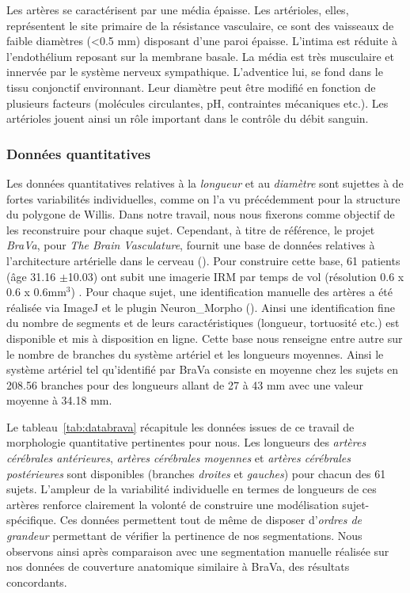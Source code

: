 Les artères se caractérisent par une média épaisse. Les artérioles, elles, représentent le site primaire de la résistance vasculaire, ce sont des vaisseaux de faible diamètres (<0.5 mm) disposant d’une paroi épaisse. L’intima est réduite à l’endothélium reposant sur la membrane basale. La média est très musculaire et innervée par le système nerveux sympathique. L’adventice lui, se fond dans le tissu conjonctif environnant. Leur diamètre peut être modifié en fonction de plusieurs facteurs (molécules circulantes, pH, contraintes mécaniques etc.). Les artérioles jouent ainsi un rôle important dans le contrôle du débit sanguin.

\subsubsection{Données quantitatives}
Les données quantitatives relatives à la {\em longueur} et au {\em diamètre} sont sujettes à de fortes variabilités individuelles, comme on l'a vu précédemment pour la structure du polygone de Willis. Dans notre travail, nous nous fixerons comme objectif de les reconstruire pour chaque sujet. Cependant, à titre de référence, le projet {\em BraVa}, pour {\em The Brain Vasculature}, fournit une base de données relatives à l'architecture artérielle dans le cerveau (\cite{Wright2013}). Pour construire cette base, 61 patients (âge 31.16 $\pm$10.03) ont subit une imagerie IRM par temps de vol (résolution 0.6 x 0.6 x 0.6mm$^3$) . Pour chaque sujet, une identification manuelle des artères a été réalisée via ImageJ et le plugin Neuron\_Morpho (\cite{neuronmorpho}). Ainsi une identification fine du nombre de segments et de leurs caractéristiques (longueur, tortuosité etc.) est disponible et mis à disposition en ligne. Cette base nous renseigne entre autre sur le nombre de branches du système artériel et les longueurs moyennes. Ainsi le système artériel tel qu'identifié par BraVa consiste en moyenne chez les sujets en 208.56 branches pour des longueurs allant de 27 à 43 mm avec une valeur moyenne à 34.18 mm.

Le tableau~\ref{tab:databrava} récapitule les données issues de ce travail de morphologie quantitative pertinentes pour nous. Les longueurs des {\em artères cérébrales antérieures}, {\em artères cérébrales moyennes} et {\em artères cérébrales postérieures} sont disponibles (branches {\em droites} et {\em gauches}) pour chacun des 61 sujets. L'ampleur de la variabilité individuelle en termes de longueurs de ces artères renforce clairement la volonté de construire une modélisation sujet-spécifique. Ces données permettent tout de même de disposer d'{\em ordres de grandeur} permettant de vérifier la pertinence de nos segmentations. Nous observons ainsi après comparaison avec une segmentation manuelle réalisée sur nos données de couverture anatomique similaire à BraVa, des résultats concordants.

